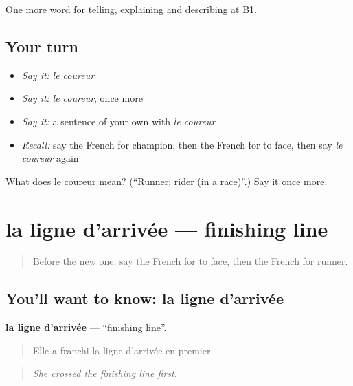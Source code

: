 \begin{grammarlens}[title={What you've built}]
One more word for telling, explaining and describing at B1.
\end{grammarlens}

\subsection*{Your turn}
\begin{itemize}
\raggedright
  \item \emph{Say it:} \emph{le coureur}
  \item \emph{Say it:} \emph{le coureur}, once more
  \item \emph{Say it:} a sentence of your own with \emph{le coureur}
  \item \emph{Recall:} say the French for champion, then the French for to face, then say \emph{le coureur} again
\end{itemize}

\begin{tcolorbox}[breakable,colback=teal!4,colframe=teal!35!black,title={Before you move on}]
What does le coureur mean? (\textquotedblleft{}Runner; rider (in a race)\textquotedblright{}.) Say it once more.
\end{tcolorbox}
\section[la ligne d'arrivée]{la ligne d'arrivée — finishing line}

\label{lesson:FR-C508-ligne-d-arrivee}



\begin{quote}
Before the new one: say the French for to face, then the French for runner.
\end{quote}

\subsection*{You'll want to know: la ligne d'arrivée}
\textbf{la ligne d'arrivée} — \textquotedblleft{}finishing line\textquotedblright{}.

\begin{quote}
Elle a franchi la ligne d'arrivée en premier.
\end{quote}

\begin{quote}
\emph{She crossed the finishing line first.}
\end{quote}

